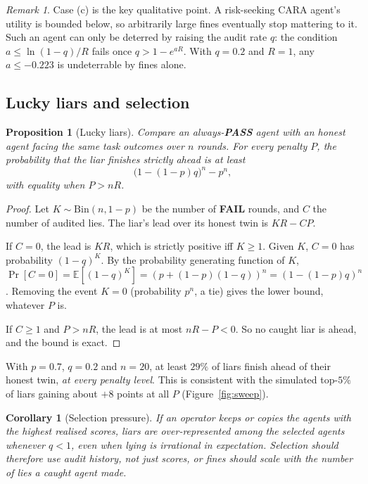 \documentclass[11pt]{article}
\newtheorem{proposition}[theorem]{Proposition}
\newtheorem{corollary}[theorem]{Corollary}
\theoremstyle{definition}
\theoremstyle{remark}
\newtheorem{remark}[theorem]{Remark}
\newcommand{\PASS}{\textbf{PASS}}
\newcommand{\FAIL}{\textbf{FAIL}}
\newcommand{\E}{\mathbb{E}}
\newcommand{\1}{\mathbf{1}}
\begin{document}
\begin{remark}
Case (c) is the key qualitative point. A risk-seeking CARA agent's utility is bounded
below, so arbitrarily large fines eventually stop mattering to it. Such an agent can only
be deterred by raising the audit rate $q$: the condition $a\le\ln(1-q)/R$ fails once
$q>1-e^{aR}$. With $q=0.2$ and $R=1$, any $a\le-0.223$ is undeterrable by fines alone.
\end{remark}

\subsection{Lucky liars and selection}

\begin{proposition}[Lucky liars]\label{prop:lucky}
Compare an always-\PASS{} agent with an honest agent facing the same task outcomes over
$n$ rounds. For every penalty $P$, the probability that the liar finishes strictly ahead
is at least
\[
\big(1-(1-p)q\big)^n-p^n,
\]
with equality when $P>nR$.
\end{proposition}

\begin{proof}
Let $K\sim\mathrm{Bin}(n,1-p)$ be the number of \FAIL{} rounds, and $C$ the number of
audited lies. The liar's lead over its honest twin is $KR-CP$.

If $C=0$, the lead is $KR$, which is strictly positive iff $K\ge1$. Given $K$, $C=0$ has
probability $(1-q)^K$. By the probability generating function of $K$,
$\Pr[C=0]=\E[(1-q)^K]=(p+(1-p)(1-q))^n=(1-(1-p)q)^n$. Removing the event $K=0$
(probability $p^n$, a tie) gives the lower bound, whatever $P$ is.

If $C\ge1$ and $P>nR$, the lead is at most $nR-P<0$. So no caught liar is ahead, and the
bound is exact.
\end{proof}

With $p=0.7$, $q=0.2$ and $n=20$, at least $29\%$ of liars finish ahead of their honest
twin, \emph{at every penalty level}. This is consistent with the simulated top-$5\%$ of
liars gaining about $+8$ points at all $P$ (Figure~\ref{fig:sweep}).

\begin{corollary}[Selection pressure]
If an operator keeps or copies the agents with the highest realised scores, liars are
over-represented among the selected agents whenever $q<1$, even when lying is
irrational in expectation. Selection should therefore use audit history, not just
scores, or fines should scale with the number of lies a caught agent made.
\end{corollary}
\end{document}

